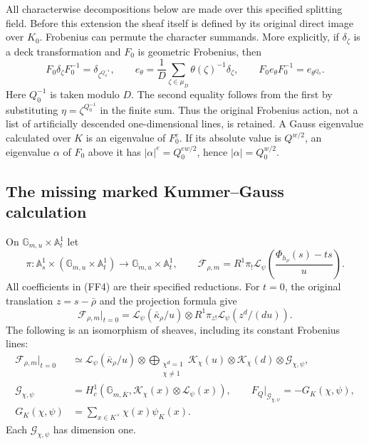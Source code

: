 \documentclass[11pt,a4paper]{article}
\theoremstyle{definition}
\begin{document}
All characterwise decompositions below are made over this specified
splitting field.  Before this extension the sheaf itself is defined by
its original direct image over \(K_0\).  Frobenius can permute the
character summands.  More explicitly, if \(\delta_\zeta\) is a deck
transformation and \(F_0\) is geometric Frobenius, then
\[
 F_0\delta_\zeta F_0^{-1}=\delta_{\zeta^{Q_0^{-1}}},
 \qquad
 e_\theta=\frac1D\sum_{\zeta\in\mu_D}
                 \theta(\zeta)^{-1}\delta_\zeta,
 \qquad F_0e_\theta F_0^{-1}=e_{\theta^{Q_0}}.           \tag{FF3}
\]
Here \(Q_0^{-1}\) is taken modulo \(D\).  The second equality follows
from the first by substituting
\(\eta=\zeta^{Q_0^{-1}}\) in the finite sum.  Thus the original
Frobenius action, not a list of artificially descended one-dimensional
lines, is retained.  A Gauss eigenvalue calculated over \(K\) is an
eigenvalue of \(F_0^e\).  If its absolute value is \(Q^{w/2}\), an
eigenvalue \(\alpha\) of \(F_0\) above it has
\(|\alpha|^e=Q_0^{ew/2}\), hence \(|\alpha|=Q_0^{w/2}\).

\subsection{The missing marked Kummer--Gauss calculation}

On \(\mathbb G_{m,u}\times\mathbb A^1_t\) let
\[
 \pi:\mathbb A^1_s\times
          (\mathbb G_{m,u}\times\mathbb A^1_t)
             \longrightarrow\mathbb G_{m,u}\times\mathbb A^1_t,
 \qquad
 \mathcal F_{\rho,m}
   =R^1\pi_!\mathcal L_\psi
        \left(\frac{\Phi_{h_\rho}(s)-ts}{u}\right).
                                                               \tag{FF4}
\]
All coefficients in (FF4) are their specified reductions.
For \(t=0\), the original translation \(z=s-\bar\rho\) and the
projection formula give
\[
 \mathcal F_{\rho,m}|_{t=0}
 =\mathcal L_\psi(\bar\kappa_\rho/u)\otimes
       R^1\pi_{z!}\mathcal L_\psi(z^d/(du)).             \tag{FF5}
\]
The following is an isomorphism of sheaves, including its constant
Frobenius lines:
\[
 \begin{split}
 \mathcal F_{\rho,m}|_{t=0}
 &\simeq\mathcal L_\psi(\bar\kappa_\rho/u)\otimes
   \bigoplus_{\substack{\chi^d=1\\\chi\ne1}}
       \mathcal K_\chi(u)\otimes\mathcal K_\chi(d)
                           \otimes\mathcal G_{\chi,\psi},\\
 \mathcal G_{\chi,\psi}
 &=H_c^1(\mathbb G_{m,\overline K},
                 \mathcal K_\chi(x)\otimes\mathcal L_\psi(x)),
 \qquad
 F_Q|_{\mathcal G_{\chi,\psi}}=-G_K(\chi,\psi),\\
 G_K(\chi,\psi)&=\sum_{x\in K^\times}\chi(x)\psi_K(x).
 \end{split}                                                  \tag{FF6}
\]
Each \(\mathcal G_{\chi,\psi}\) has dimension one.
\end{document}
